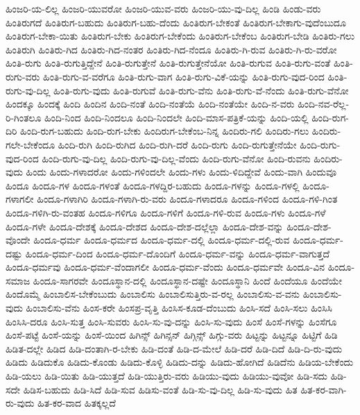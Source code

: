 {ಹಿಂಜರಿ-ಯ-ಲಿಲ್ಲ
ಹಿಂಜರಿ-ಯುವರೋ
ಹಿಂಜರಿ-ಯುವ-ವರು
ಹಿಂಜರಿ-ಯು-ವು-ದಿಲ್ಲ
ಹಿಂಡಿ
ಹಿಂಡು-ವರು
ಹಿಂತಿರುಗದೆ
ಹಿಂತಿರುಗ-ಬಹುದು
ಹಿಂತಿರುಗ-ಬಹು-ದೆಂದು
ಹಿಂತಿರುಗ-ಬೇಕಂತೆ
ಹಿಂತಿರುಗ-ಬೇಕಾಗು-ವುದೆಂಬುದೂ
ಹಿಂತಿರುಗ-ಬೇಕಾ-ಯಿತು
ಹಿಂತಿರುಗ-ಬೇಕು
ಹಿಂತಿರುಗ-ಬೇಕೆಂದು
ಹಿಂತಿರುಗ-ಬೇಕೆಂಬ
ಹಿಂತಿರುಗ-ಬೇಡಿ
ಹಿಂತಿರು-ಗಲು
ಹಿಂತಿರುಗಿ
ಹಿಂತಿರು-ಗಿದ
ಹಿಂತಿರು-ಗಿದ-ನಂತರ
ಹಿಂತಿರು-ಗಿದ-ನೆಂದೂ
ಹಿಂತಿರು-ಗಿ-ರುವ
ಹಿಂತಿರು-ಗಿ-ರು-ವರೋ
ಹಿಂತಿ-ರುಗು
ಹಿಂತಿ-ರುಗುತ್ತಿದ್ದೇನೆ
ಹಿಂತಿ-ರುಗುತ್ತೇನೆ
ಹಿಂತಿ-ರುಗುತ್ತೇನೆಯೋ
ಹಿಂತಿ-ರುಗುವ
ಹಿಂತಿ-ರುಗು-ವಂತೆ
ಹಿಂತಿ-ರುಗು-ವರು
ಹಿಂತಿ-ರುಗು-ವ-ವರೆಗೂ
ಹಿಂತಿ-ರುಗು-ವಾಗ
ಹಿಂತಿ-ರುಗು-ವಿಕೆ-ಯನ್ನು
ಹಿಂತಿ-ರುಗು-ವುದ-ರಿಂದ
ಹಿಂತಿ-ರುಗು-ವು-ದಿಲ್ಲ
ಹಿಂತಿ-ರುಗು-ವುದು
ಹಿಂತಿ-ರುಗುವೆ
ಹಿಂತಿ-ರುಗು-ವೆನು
ಹಿಂತಿ-ರುಗು-ವೆ-ನೆಂದು
ಹಿಂತಿ-ರುಗು-ವೆನೋ
ಹಿಂದಕ್ಕೂ
ಹಿಂದಕ್ಕೆ
ಹಿಂದಿ
ಹಿಂದಿನ
ಹಿಂದಿ-ನಂತೆ
ಹಿಂದಿ-ನಂತೆಯೆ
ಹಿಂದಿ-ನಂತೆಯೇ
ಹಿಂದಿ-ನ-ವರು
ಹಿಂದಿ-ನವ-ರೆಲ್ಲ-ರಿ-ಗಿಂತಲೂ
ಹಿಂದಿ-ನಿಂದ
ಹಿಂದಿ-ನಿಂದಲೂ
ಹಿಂದಿ-ನಿಂದಲೇ
ಹಿಂದಿ-ಮಾಸ-ಪತ್ರಿಕೆ-ಯನ್ನು
ಹಿಂದಿ-ಯಲ್ಲಿ
ಹಿಂದಿ-ರುಗ-ದಿರಿ
ಹಿಂದಿ-ರುಗ-ಬಹುದು
ಹಿಂದಿ-ರುಗ-ಬೇಕು
ಹಿಂದಿರುಗ-ಬೇಕೆಂಬ-ನಿನ್ನ
ಹಿಂದಿರು-ಗಲಿ
ಹಿಂದಿರು-ಗಲು
ಹಿಂದಿರು-ಗಲೇ-ಬೇಕೆಂದೂ
ಹಿಂದಿ-ರುಗಿ
ಹಿಂದಿ-ರುಗಿದ
ಹಿಂದಿ-ರುಗಿ-ದರೆ
ಹಿಂದಿ-ರುಗು
ಹಿಂದಿ-ರುಗುತ್ತೇನೆಯೇ
ಹಿಂದಿ-ರುಗು-ವುದ-ರಿಂದ
ಹಿಂದಿ-ರುಗು-ವು-ದಿಲ್ಲ
ಹಿಂದಿ-ರುಗು-ವು-ದಿಲ್ಲ-ವೆಂದು
ಹಿಂದಿ-ರುಗು-ವೆನೋ
ಹಿಂದಿ-ರುವನು
ಹಿಂದಿರು-ವುದು
ಹಿಂದು
ಹಿಂದು-ಗಳಾದರೋ
ಹಿಂದು-ಗಳಿಂದಲೇ
ಹಿಂದು-ಗಳು
ಹಿಂದು-ಳಿದಿದ್ದೇವೆ
ಹಿಂದು-ವಾಗಿ
ಹಿಂದುವೂ
ಹಿಂದೂ
ಹಿಂದೂ-ಗಳ
ಹಿಂದೂ-ಗಳಂತೆ
ಹಿಂದೂ-ಗಳದ್ದಿರ-ಬಹುದು
ಹಿಂದೂ-ಗಳನ್ನು
ಹಿಂದೂ-ಗಳಲ್ಲಿ
ಹಿಂದೂ-ಗಳಾಗಲೀ
ಹಿಂದೂ-ಗಳಾಗಿರಿ
ಹಿಂದೂ-ಗಳಾಗಿ-ರು-ವರು
ಹಿಂದೂ-ಗಳಾದರೂ
ಹಿಂದೂ-ಗಳಿಂದ
ಹಿಂದೂ-ಗಳಿ-ಗಿಂತ
ಹಿಂದೂ-ಗಳಿಗಿ-ರು-ವಂತಹ
ಹಿಂದೂ-ಗಳಿಗೂ
ಹಿಂದೂ-ಗಳಿಗೆ
ಹಿಂದೂ-ಗಳಿ-ರುವ
ಹಿಂದೂ-ಗಳು
ಹಿಂದೂ-ಗಳೆ
ಹಿಂದೂ-ಗಳೇ
ಹಿಂದೂ-ದೇಶಕ್ಕೆ
ಹಿಂದೂ-ದೇಶದ
ಹಿಂದೂ-ದೇಶ-ದಲ್ಲೆಲ್ಲಾ
ಹಿಂದೂ-ದೇಶ-ವನ್ನು
ಹಿಂದೂ-ದೇಶ-ವೊಂದೇ
ಹಿಂದೂ-ಧರ್ಮ
ಹಿಂದೂ-ಧರ್ಮದ
ಹಿಂದೂ-ಧರ್ಮ-ದಲ್ಲಿ
ಹಿಂದೂ-ಧರ್ಮ-ದಲ್ಲಿ-ರುವ
ಹಿಂದೂ-ಧರ್ಮ-ದಷ್ಟು
ಹಿಂದೂ-ಧರ್ಮ-ದಿಂದ
ಹಿಂದೂ-ಧರ್ಮ-ದೊಂದಿಗೆ
ಹಿಂದೂ-ಧರ್ಮ-ವನ್ನು
ಹಿಂದೂ-ಧರ್ಮ-ವಾಗುತ್ತದೆ
ಹಿಂದೂ-ಧರ್ಮವು
ಹಿಂದೂ-ಧರ್ಮ-ವೆಂದಾಗಲೀ
ಹಿಂದೂ-ಧರ್ಮ-ವೆಂದು
ಹಿಂದೂ-ಧರ್ಮವೇ
ಹಿಂದೂ-ವಿನ
ಹಿಂದೂ-ಸಮಾಜ
ಹಿಂದೂ-ಸಾಗರವೇ
ಹಿಂದೂಸ್ಥಾನ-ದಲ್ಲಿ
ಹಿಂದೂಸ್ಥಾನ-ದಷ್ಟೇ
ಹಿಂದೂಸ್ಥಾನಿ
ಹಿಂದೆ
ಹಿಂದೆಯೂ
ಹಿಂದೆಯೇ
ಹಿಂದೊಮ್ಮೆ
ಹಿಂಬಾಲಿಸ-ಬೇಕೆಂಬುದು
ಹಿಂಬಾಲಿಸು
ಹಿಂಬಾಲಿಸುತ್ತಿರು-ವ-ರಲ್ಲ
ಹಿಂಬಾಲಿಸು-ವ-ವನು
ಹಿಂಬಾಲಿಸು-ವುದು
ಹಿಂಬಾಲಿಸು-ವೆನು
ಹಿಂಸ-ಕರೇ
ಹಿಂಸಪ್ರ-ವೃತ್ತಿ
ಹಿಂಸಿಸ-ಕೂಡ-ದೆಂಬುದು
ಹಿಂಸಿ-ಸದೆ
ಹಿಂಸಿ-ಸಲು
ಹಿಂಸಿಸಿ
ಹಿಂಸಿಸಿ-ದರೂ
ಹಿಂಸಿ-ಸುತ್ತ
ಹಿಂಸಿ-ಸುವರು
ಹಿಂಸಿ-ಸು-ವು-ದನ್ನು
ಹಿಂಸಿ-ಸು-ವುದು
ಹಿಂಸೆ
ಹಿಂಸೆ-ಗಳನ್ನು
ಹಿಂಸೆಗೂ
ಹಿಂಸೆ-ಪಟ್ಟೆ
ಹಿಂಸೆ-ಯನ್ನು
ಹಿಂಸೆ-ಯಿಂದ
ಹಿಗಿನ್ಸ್
ಹಿಗಿನ್ಸನ್
ಹಿಗ್ಗಿನ್ಸ್
ಹಿಗ್ಗು-ವರು
ಹಿಟ್ಟನ್ನು
ಹಿಟ್ಟನ್ನೂ
ಹಿಟ್ಟಿಗೆ
ಹಿಡಿ
ಹಿಡಿತ-ದಲ್ಲೇ
ಹಿಡಿದ
ಹಿಡಿ-ದಂತಾಗಿ-ರ-ಬೇಕು
ಹಿಡಿ-ದಂತೆ
ಹಿಡಿ-ದ-ಮೇಲೆ
ಹಿಡಿ-ದರೆ
ಹಿಡಿ-ದಿದೆ
ಹಿಡಿ-ದಿ-ರು-ವುದು
ಹಿಡಿದು
ಹಿಡಿದುಕೊ
ಹಿಡಿದು-ಕೊಂಡು
ಹಿಡಿದು-ಕೊಳ್ಳಿ
ಹಿಡಿದು-ದನ್ನು
ಹಿಡಿದು-ಹೋಗಿದೆ
ಹಿಡಿದೆನು
ಹಿಡಿಯ-ಬೇಕೆಂದು
ಹಿಡಿ-ಯಲು
ಹಿಡಿ-ಯಿತು
ಹಿಡಿ-ಯುತ್ತದೆ
ಹಿಡಿ-ಯುತ್ತಿರು-ವರು
ಹಿಡಿಯು-ವುದು
ಹಿಡಿಯು-ವುವೋ
ಹಿಡಿ-ಸದು
ಹಿಡಿ-ಸದೇ
ಹಿಡಿಸ-ಬಹುದು
ಹಿಡಿ-ಸಿದೆ
ಹಿಡಿ-ಸುವ
ಹಿಡಿಸು-ವಂತೆ
ಹಿಡಿ-ಸು-ವು-ದಿಲ್ಲ
ಹಿಡಿ-ಸು-ವುದು
ಹಿತ
ಹಿತ-ಕರ-ವಾಗಿ-ರು-ವುದು
ಹಿತ-ಕರ-ವಾದ
ಹಿತಕ್ಕಲ್ಲದೆ
}
